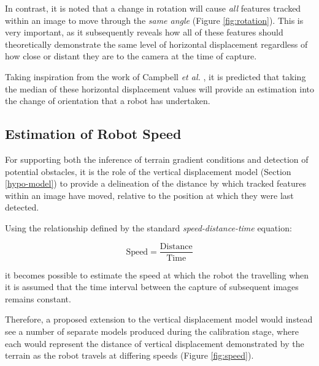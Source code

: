 In contrast, it is noted that a change in rotation will cause \textit{all} features tracked within an image to move through the \textit{same angle} \cite{campbell} (Figure \ref{fig:rotation}). This is very important, as it subsequently reveals how all of these features should theoretically demonstrate the same level of horizontal displacement regardless of how close or distant they are to the camera at the time of capture.

Taking inspiration from the work of Campbell \textit{et al.} \cite{campbell}, it is predicted that taking the median of these horizontal displacement values will provide an estimation into the change of orientation that a robot has undertaken.

\subsection{Estimation of Robot Speed}
\label{hypo-speed}
For supporting both the inference of terrain gradient conditions and detection of potential obstacles, it is the role of the vertical displacement model (Section \ref{hypo-model})  to provide a delineation of the distance by which tracked features within an image have moved, relative to the position at which they were last detected. 

Using the relationship defined by the standard \textit{speed-distance-time} equation:

\begin{equation}
\text{Speed} = \frac{\text{Distance}}{\text{Time}} 
\end{equation}

it becomes possible to estimate the speed at which the robot the travelling when it is assumed that the time interval between the capture of subsequent images remains constant.

Therefore, a proposed extension to the vertical displacement model would instead see a number of separate models produced during the calibration stage, where each would represent the distance of vertical displacement demonstrated by the terrain as the robot travels at differing speeds (Figure \ref{fig:speed}).


